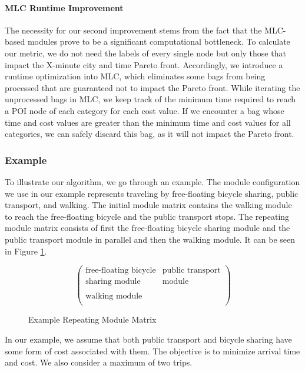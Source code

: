 \paragraph{MLC Runtime Improvement}
The necessity for our second improvement stems from the fact that the MLC-based modules prove to be a significant computational bottleneck.
To calculate our metric, we do not need the labels of every single node but only those that impact the X-minute city and time Pareto front.
Accordingly, we introduce a runtime optimization into MLC, which eliminates some bags from being processed that are guaranteed not to impact the Pareto front.
While iterating the unprocessed bags in MLC, we keep track of the minimum time required to reach a POI node of each category for each cost value.
If we encounter a bag whose time and cost values are greater than the minimum time and cost values for all categories, we can safely discard this bag, as it will not impact the Pareto front.


\subsubsection{Example}
\label{subsubsec:example}

To illustrate our algorithm, we go through an example.
The module configuration we use in our example represents traveling by free-floating bicycle sharing, public transport, and walking.
The initial module matrix contains the walking module to reach the free-floating bicycle and the public transport stops.
The repeating module matrix consists of first the free-floating bicycle sharing module and the public transport module in parallel and then the walking module.
It can be seen in Figure \ref{fig:example_module_matrix}.


\begin{figure}[ht]
\centering
\[
\begin{pmatrix}
\text{free-floating bicycle} & \text{public transport} \\
\text{sharing module} & \text{module} \\
\\
\text{walking module} & \\
\end{pmatrix}
\]
\caption{Example Repeating Module Matrix}
\label{fig:example_module_matrix}
\end{figure}

In our example, we assume that both public transport and bicycle sharing have some form of cost associated with them.
The objective is to minimize arrival time and cost.
We also consider a maximum of two trips.

